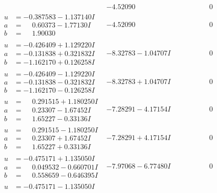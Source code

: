 \documentclass[1p]{elsarticle_modified}
\theoremstyle{definition}
\begin{document}
$$\begin{array}{c|c|c}
 & -4.52090\phantom{ +0.000000I} & \phantom{-0.000000 } 0 \\ \hline\begin{aligned}
u &= -0.387583 - 1.137140 I \\
a &= \phantom{-}0.60373 - 1.77130 I \\
b &= \phantom{-}1.90030\phantom{ +0.000000I}\end{aligned}
 & -4.52090\phantom{ +0.000000I} & \phantom{-0.000000 } 0 \\ \hline\begin{aligned}
u &= -0.426409 + 1.129220 I \\
a &= -0.131838 + 0.321832 I \\
b &= -1.162170 + 0.126258 I\end{aligned}
 & -8.32783 - 1.04707 I & \phantom{-0.000000 } 0 \\ \hline\begin{aligned}
u &= -0.426409 - 1.129220 I \\
a &= -0.131838 - 0.321832 I \\
b &= -1.162170 - 0.126258 I\end{aligned}
 & -8.32783 + 1.04707 I & \phantom{-0.000000 } 0 \\ \hline\begin{aligned}
u &= \phantom{-}0.291515 + 1.180250 I \\
a &= \phantom{-}0.23307 - 1.67452 I \\
b &= \phantom{-}1.65227 - 0.33136 I\end{aligned}
 & -7.28291 - 4.17154 I & \phantom{-0.000000 } 0 \\ \hline\begin{aligned}
u &= \phantom{-}0.291515 - 1.180250 I \\
a &= \phantom{-}0.23307 + 1.67452 I \\
b &= \phantom{-}1.65227 + 0.33136 I\end{aligned}
 & -7.28291 + 4.17154 I & \phantom{-0.000000 } 0 \\ \hline\begin{aligned}
u &= -0.475171 + 1.135050 I \\
a &= \phantom{-}0.049532 - 0.660701 I \\
b &= \phantom{-}0.558659 - 0.646395 I\end{aligned}
 & -7.97068 - 6.77480 I & \phantom{-0.000000 } 0 \\ \hline\begin{aligned}
u &= -0.475171 - 1.135050 I \\

\end{aligned}
\end{array}$$
\end{document}
